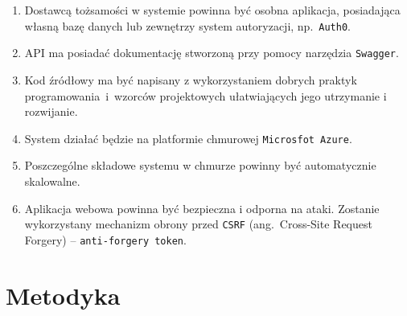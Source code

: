\begin{enumerate}[labelwidth=\widthof{\ref{last-item}},label=\arabic*.]
\item Dostawcą tożsamości w systemie powinna być osobna aplikacja, posiadająca własną bazę danych lub zewnętrzy system autoryzacji, np.~\texttt{Auth0}.

\item API ma posiadać dokumentację stworzoną przy pomocy narzędzia \texttt{Swagger}.

\item Kod źródłowy ma być napisany z wykorzystaniem dobrych praktyk programowania~i~wzorców projektowych ułatwiających jego utrzymanie i rozwijanie.

\item System działać będzie na platformie chmurowej \texttt{Microsfot Azure}.

\item Poszczególne składowe systemu w chmurze powinny być automatycznie skalowalne.

\item Aplikacja webowa powinna być bezpieczna i odporna na ataki. Zostanie wykorzystany mechanizm obrony przed \texttt{CSRF} (ang.~Cross-Site Request Forgery) -- \texttt{anti-forgery token}.

\end{enumerate}

\section{Metodyka}
\label{sec:metodyka}